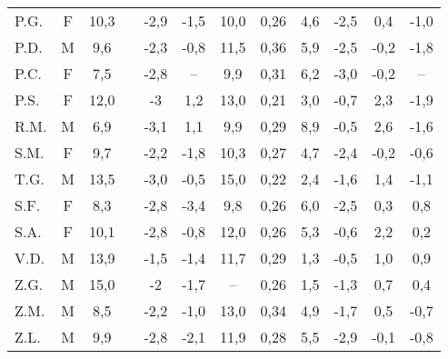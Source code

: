 \begin{sidewaystable}
\begin{tabular}{lccccccccccc}
P.G. & F & 10,3 & \checkmark 	& -2,9 & -1,5 & 10,0 & 0,26 & 4,6 & -2,5 & 0,4  & -1,0                    \\
P.D. & M & 9,6  &  		& -2,3 & -0,8 & 11,5 & 0,36 & 5,9 & -2,5 & -0,2 & -1,8                           \\
P.C. & F & 7,5  &  		& -2,8 & --   & 9,9  & 0,31 & 6,2 & -3,0 & -0,2 & --                           \\
P.S. & F & 12,0 &  		&  -3  & 1,2  & 13,0 & 0,21 & 3,0 & -0,7 & 2,3  & -1,9                           \\
R.M. & M & 6,9  & \checkmark 	& -3,1 & 1,1  & 9,9  & 0,29 & 8,9 & -0,5 & 2,6  & -1,6                    \\
S.M. & F & 9,7  &  	       & -2,2 & -1,8 & 10,3 & 0,27 & 4,7 & -2,4 & -0,2 & -0,6                    \\
T.G. & M & 13,5   &             & -3,0 & -0,5 & 15,0 & 0,22 & 2,4 & -1,6 & 1,4 & -1,1     \\
S.F. & F & 8,3  &  		& -2,8 & -3,4 & 9,8  & 0,26 & 6,0 & -2,5 & 0,3  & 0,8                            \\
S.A. & F & 10,1 &  		& -2,8 & -0,8 & 12,0 & 0,26 & 5,3 & -0,6 & 2,2  & 0,2                            \\
V.D. & M & 13,9 &  		& -1,5 & -1,4 & 11,7 & 0,29 & 1,3 & -0,5 & 1,0  & 0,9                            \\
Z.G. & M & 15,0 &  		&  -2  & -1,7 &   --   & 0,26 & 1,5 & -1,3 & 0,7  & 0,4                            \\
Z.M. & M & 8,5  &  		& -2,2 & -1,0 & 13,0 & 0,34 & 4,9 & -1,7 & 0,5  & -0,7                           \\
Z.L. & M & 9,9  &  		& -2,8 & -2,1 & 11,9 & 0,28 & 5,5 & -2,9 & -0,1 & -0,8                           \\

\bottomrule
\end{tabular}
\end{sidewaystable}